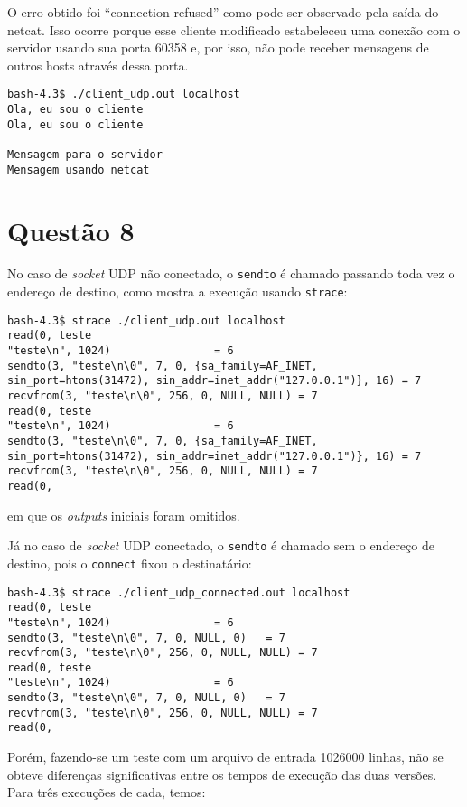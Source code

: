 \documentclass[a4paper,10pt]{article}
\begin{document}
O erro obtido foi ``connection refused'' como pode ser observado pela saída do netcat. Isso ocorre porque esse cliente modificado estabeleceu uma conexão com o servidor usando sua porta 60358 e, por isso, não pode receber mensagens de outros hosts através dessa porta.

\begin{lstlisting}
bash-4.3$ ./client_udp.out localhost
Ola, eu sou o cliente
Ola, eu sou o cliente

Mensagem para o servidor
Mensagem usando netcat
\end{lstlisting}

\section{Questão 8}
No caso de \textit{socket} UDP não conectado, o {\tt sendto} é chamado passando toda vez o endereço de destino, como mostra a execução usando {\tt strace}:

\begin{lstlisting}
bash-4.3$ strace ./client_udp.out localhost
read(0, teste
"teste\n", 1024)                = 6
sendto(3, "teste\n\0", 7, 0, {sa_family=AF_INET, sin_port=htons(31472), sin_addr=inet_addr("127.0.0.1")}, 16) = 7
recvfrom(3, "teste\n\0", 256, 0, NULL, NULL) = 7
read(0, teste
"teste\n", 1024)                = 6
sendto(3, "teste\n\0", 7, 0, {sa_family=AF_INET, sin_port=htons(31472), sin_addr=inet_addr("127.0.0.1")}, 16) = 7
recvfrom(3, "teste\n\0", 256, 0, NULL, NULL) = 7
read(0, 

\end{lstlisting}

em que os \textit{outputs} iniciais foram omitidos.

Já no caso de \textit{socket} UDP conectado, o {\tt sendto} é chamado sem o endereço de destino, pois o {\tt connect} fixou o destinatário:

\begin{lstlisting}
bash-4.3$ strace ./client_udp_connected.out localhost
read(0, teste
"teste\n", 1024)                = 6
sendto(3, "teste\n\0", 7, 0, NULL, 0)   = 7
recvfrom(3, "teste\n\0", 256, 0, NULL, NULL) = 7
read(0, teste
"teste\n", 1024)                = 6
sendto(3, "teste\n\0", 7, 0, NULL, 0)   = 7
recvfrom(3, "teste\n\0", 256, 0, NULL, NULL) = 7
read(0, 

\end{lstlisting}

Porém, fazendo-se um teste com um arquivo de entrada 1026000 linhas, não se obteve diferenças significativas entre os tempos de execução das duas versões. Para três execuções de cada, temos:
\end{document}
